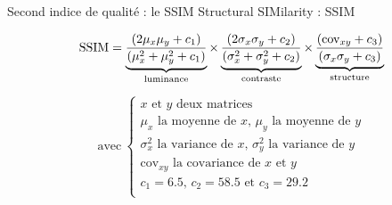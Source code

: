 \documentclass[xcolor=dvipsnames]{beamer}
\begin{document}
\begin{frame} {Second indice de qualité : le SSIM}
    \centering
    \scriptsize
    Structural SIMilarity : SSIM
    
    \[
        \text{SSIM} = 
        \underbrace{\frac{(2\mu_x\mu_y + c_1)}{(\mu_x^2 + \mu_y^2 + c_1)}}_{\text{\scriptsize luminance}}
        \times
        \underbrace{\frac{(2\sigma_x\sigma_y + c_2)}{(\sigma_x^2 + \sigma_y^2 + c_2)}}_{\text{\scriptsize contraste}}
        \times
        \underbrace{\frac{(\text{cov}_{xy} + c_3)}{(\sigma_x\sigma_y + c_3)}}_{\text{\scriptsize structure}}
    \]

    \[
        \text{avec} \ 
        \begin{cases}
        \text{$x$ et $y$ deux matrices} \\
        \text{$\mu_x$ la moyenne de $x$, $\mu_y$ la moyenne de $y$} \\
        \text{$\sigma_x^2$ la variance de $x$, $\sigma_y^2$ la variance de $y$} \\
        \text{$\text{cov}_{xy}$ la covariance de $x$ et $y$} \\        
        \text{$c_1 = 6.5$, $c_2 = 58.5$ et $c_3 = 29.2$} \\        
        \end{cases}
    \]

\end{frame}
\end{document}
